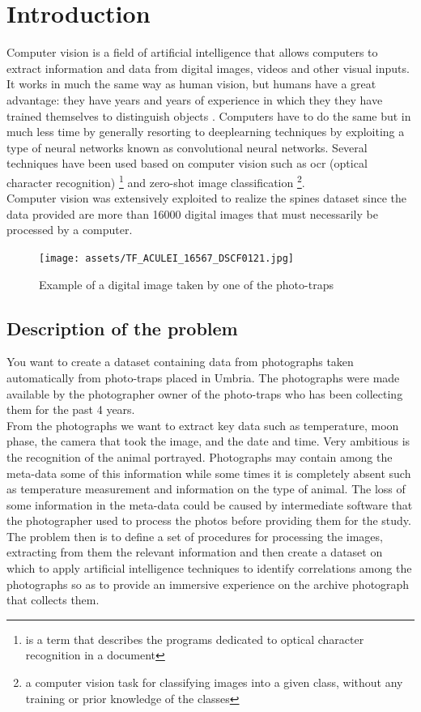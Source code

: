 \documentclass[12pt,a4paper,twoside]{article}
\begin{document}
\section{Introduction}
Computer vision is a field of artificial intelligence that allows computers to extract 
information and data from digital images, videos and other visual inputs. It works in much the same way as human vision, but humans have a great advantage: they have years and years of experience in which they they have trained themselves to distinguish objects \cite{ibm-comp-vision}. Computers have to do the same but in much less time by generally resorting to deeplearning techniques by exploiting a type of neural networks known as convolutional neural networks. Several techniques have been used based on computer vision such as ocr (optical character recognition) \footnote{is a term that describes the programs dedicated to optical character recognition in a document} and zero-shot image classification \footnote{a computer vision task for classifying images into a given class, without any training or prior knowledge of the classes}. \\ Computer vision was extensively exploited to realize the spines dataset since the data provided are more than 16000 digital images that must necessarily be processed by a computer.

\begin{figure}[!ht]
    \centering
    \texttt{[image: assets/TF\_ACULEI\_16567\_DSCF0121.jpg]}
    \caption{Example of a digital image taken by one of the photo-traps}
    \label{fig:TF_ACULEI_16567_DSCF0121}
\end{figure}

\subsection{Description of the problem}
You want to create a dataset containing data from photographs taken automatically from photo-traps 
placed in Umbria. The photographs were made available by the photographer owner of the 
photo-traps who has been collecting them for the past 4 years.\\
From the photographs we want to extract key data such as temperature, moon phase, the camera 
that took the image, and the date and time. Very ambitious is the recognition of the animal portrayed. Photographs may contain among the meta-data some of this information while some times it is completely absent such as temperature measurement and information on the type of 
animal. The loss of some information in the meta-data could be caused by intermediate software 
that the photographer used to process the photos before providing them for the study.\\ 
The problem then is to define a set of procedures for processing the images, extracting from them the relevant information and then create a dataset on which to apply artificial intelligence techniques to identify correlations among the photographs so as to provide an immersive experience on the archive photograph that collects them.
\end{document}
